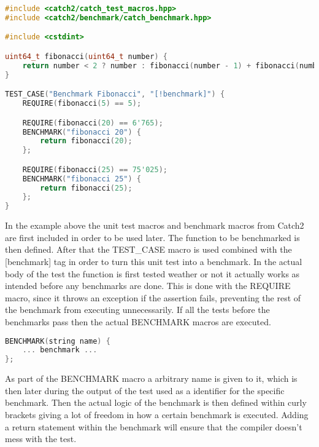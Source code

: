 \begin{minipage}{\textwidth}
\begin{lstlisting}[language=C++, caption=Example of Catch2 benchmark creation]
#include <catch2/catch_test_macros.hpp>
#include <catch2/benchmark/catch_benchmark.hpp>

#include <cstdint>

uint64_t fibonacci(uint64_t number) {
    return number < 2 ? number : fibonacci(number - 1) + fibonacci(number - 2);
}

TEST_CASE("Benchmark Fibonacci", "[!benchmark]") {
    REQUIRE(fibonacci(5) == 5);

    REQUIRE(fibonacci(20) == 6'765);
    BENCHMARK("fibonacci 20") {
        return fibonacci(20);
    };

    REQUIRE(fibonacci(25) == 75'025);
    BENCHMARK("fibonacci 25") {
        return fibonacci(25);
    };
}
\end{lstlisting}
\end{minipage}

In the example above the unit test macros and benchmark macros from Catch2 are first included in order to be used later. The function to be benchmarked is then defined.
After that the TEST\_CASE macro is used combined with the [\!benchmark] tag in order to turn this unit test into a benchmark. In the actual body of the test the function
is first tested weather or not it actually works as intended before any benchmarks are done. This is done with the REQUIRE macro, since it throws an exception if the 
assertion fails, preventing the rest of the benchmark from executing unnecessarily. If all the tests before the benchmarks pass then the actual BENCHMARK macros are
executed.

\begin{minipage}{\textwidth}
\begin{lstlisting}[language=C++]
BENCHMARK(string name) {
    ... benchmark ...
};
\end{lstlisting}
\end{minipage}

As part of the BENCHMARK macro a arbitrary name is given to it, which is then later during the output of the test used as a identifier for the specific benchmark.
Then the actual logic of the benchmark is then defined within curly brackets giving a lot of freedom in how a certain benchmark is executed. Adding a return statement
within the benchmark will ensure that the compiler doesn't mess with the test.\\

